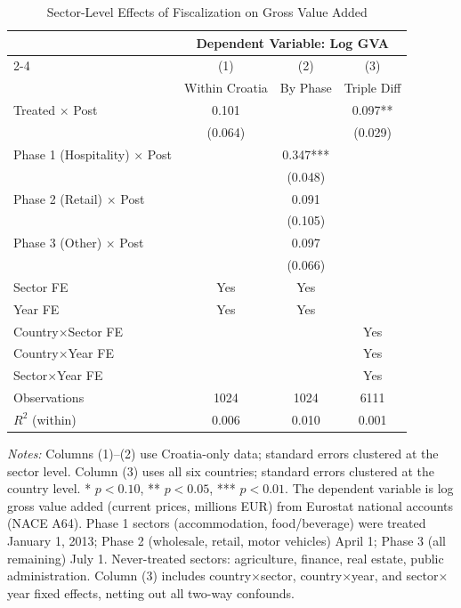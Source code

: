 \begin{table}[htbp]
\centering
\caption{Sector-Level Effects of Fiscalization on Gross Value Added}
\label{tab:sector}
\begin{tabular}{lccc}
\hline\hline
 & \multicolumn{3}{c}{Dependent Variable: Log GVA} \\
\cmidrule(lr){2-4}
 & (1) & (2) & (3) \\
 & Within Croatia & By Phase & Triple Diff \\
\hline
Treated $\times$ Post & 0.101 &  & 0.097** \\
 & (0.064) &  & (0.029) \\
Phase 1 (Hospitality) $\times$ Post &  & 0.347*** &  \\
 &  & (0.048) &  \\
Phase 2 (Retail) $\times$ Post &  & 0.091 &  \\
 &  & (0.105) &  \\
Phase 3 (Other) $\times$ Post &  & 0.097 &  \\
 &  & (0.066) &  \\
\hline
Sector FE & Yes & Yes &  \\
Year FE & Yes & Yes &  \\
Country$\times$Sector FE &  &  & Yes \\
Country$\times$Year FE &  &  & Yes \\
Sector$\times$Year FE &  &  & Yes \\
Observations & 1024 & 1024 & 6111 \\
$R^2$ (within) & 0.006 & 0.010 & 0.001 \\
\hline\hline
\end{tabular}
\begin{tablenotes}[flushleft]
\footnotesize
\item \textit{Notes:} Columns (1)--(2) use Croatia-only data; standard errors clustered at the sector level. Column (3) uses all six countries; standard errors clustered at the country level. * $p < 0.10$, ** $p < 0.05$, *** $p < 0.01$. The dependent variable is log gross value added (current prices, millions EUR) from Eurostat national accounts (NACE A64). Phase 1 sectors (accommodation, food/beverage) were treated January 1, 2013; Phase 2 (wholesale, retail, motor vehicles) April 1; Phase 3 (all remaining) July 1. Never-treated sectors: agriculture, finance, real estate, public administration. Column (3) includes country$\times$sector, country$\times$year, and sector$\times$year fixed effects, netting out all two-way confounds.
\end{tablenotes}
\end{table}

